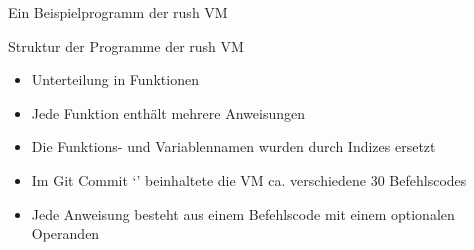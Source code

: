 \begin{frame}{Ein Beispielprogramm der rush VM}
	\hspace{0pt} %
	\vfill
	\vfill
\end{frame}

\begin{frame}{Struktur der Programme der rush VM}
	\begin{itemize}
		\item Unterteilung in Funktionen
		\item Jede Funktion enthält mehrere Anweisungen
		\item Die Funktions- und Variablennamen wurden durch Indizes ersetzt
		\item Im Git Commit `\rushCommit{}' beinhaltete die VM ca. verschiedene 30 Befehlscodes
		\item Jede Anweisung besteht aus einem Befehlscode mit einem optionalen Operanden
	\end{itemize}
\end{frame}
